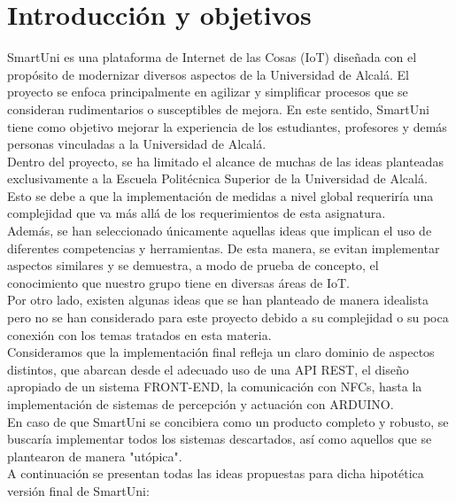 \documentclass[12pt]{report}
\begin{document}
\chapter{Introducción y objetivos}
SmartUni es una plataforma de Internet de las Cosas (IoT) diseñada con el propósito de modernizar diversos aspectos de la Universidad de Alcalá. El proyecto se enfoca principalmente en agilizar y simplificar procesos que se consideran rudimentarios o susceptibles de mejora. En este sentido, SmartUni tiene como objetivo mejorar la experiencia de los estudiantes, profesores y demás personas vinculadas a la Universidad de Alcalá.
\\
Dentro del proyecto, se ha limitado el alcance de muchas de las ideas planteadas exclusivamente a la Escuela Politécnica Superior de la Universidad de Alcalá. Esto se debe a que la implementación de medidas a nivel global requeriría una complejidad que va más allá de los requerimientos de esta asignatura.
\\
Además, se han seleccionado únicamente aquellas ideas que implican el uso de diferentes competencias y herramientas. De esta manera, se evitan implementar aspectos similares y se demuestra, a modo de prueba de concepto, el conocimiento que nuestro grupo tiene en diversas áreas de IoT.
\\
Por otro lado, existen algunas ideas que se han planteado de manera idealista pero no se han considerado para este proyecto debido a su complejidad o su poca conexión con los temas tratados en esta materia.
\\
Consideramos que la implementación final refleja un claro dominio de aspectos distintos, que abarcan desde el adecuado uso de una API REST, el diseño apropiado de un sistema FRONT-END, la comunicación con NFCs, hasta la implementación de sistemas de percepción y actuación con ARDUINO.
\\
En caso de que SmartUni se concibiera como un producto completo y robusto, se buscaría implementar todos los sistemas descartados, así como aquellos que se plantearon de manera "utópica".
\\
A continuación se presentan todas las ideas propuestas para dicha hipotética versión final de SmartUni:
\\
\end{document}
